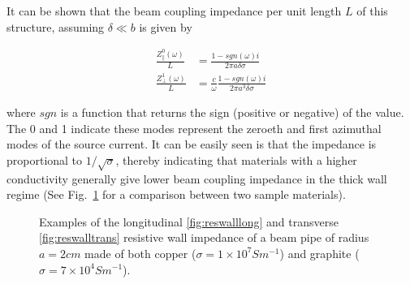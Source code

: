 It can be shown that the beam coupling impedance per unit length $L$ of this structure, assuming $\delta \ll b$ is given by

\begin{align}
\frac{Z_{\parallel}^{0}  \left( \omega \right)}{L} &= \frac{1 - sgn \left( \omega \right) i }{2 \pi a \delta \sigma} \\
\frac{Z_{\perp}^{1}  \left( \omega \right)}{L} &= \frac{c}{\omega}\frac{1 - sgn \left( \omega \right) i }{2 \pi a^{3} \delta \sigma}
\end{align}

where $sgn$ is a function that returns the sign (positive or negative) of the value. The 0 and 1 indicate these modes represent the zeroeth and first azimuthal modes of the source current. It can be easily seen is that the impedance is proportional to $1/ \sqrt{\sigma}$, thereby indicating that materials with a higher conductivity generally give lower beam coupling impedance in the thick wall regime (See Fig.~\ref{fig:resWallImpComp} for a comparison between two sample materials).

\begin{figure}

\caption{Examples of the longitudinal \ref{fig:reswalllong} and transverse \ref{fig:reswalltrans} resistive wall impedance of a beam pipe of radius $a = 2cm$ made of both copper ($\sigma = 1 \times 10^{7} S m^{-1}$) and graphite ($\sigma = 7 \times 10^{4} S m^{-1}$).}
\label{fig:resWallImpComp}
\end{figure}


